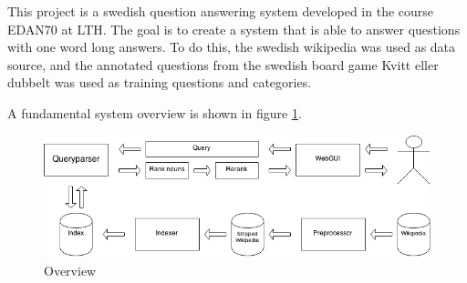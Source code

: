 This project is a swedish question answering system developed in the course EDAN70 at LTH.
The goal is to create a system that is able to answer questions with one word long answers.
To do this, the swedish wikipedia was used as data source, and the annotated questions from the swedish 
board game Kvitt eller dubbelt was used as training questions and categories.

A fundamental system overview is shown in figure \ref{fig:overview}. 

\begin{figure}
\centering
\includegraphics[width=1\textwidth]{figures/Question-answering-system.png}
\caption{Overview}
\label{fig:overview}
\end{figure}
